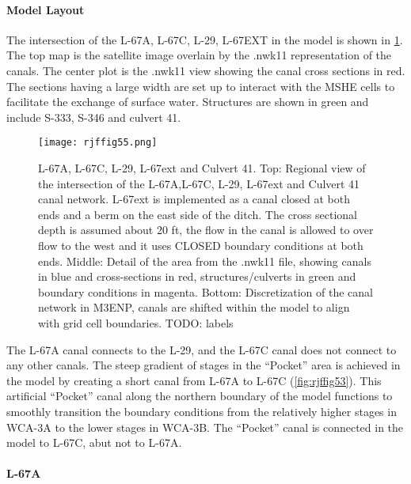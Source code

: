 \paragraph{Model Layout}

The intersection of the L-67A, L-67C, L-29, L-67EXT in the model is shown in \ref{fig:rjffig55}. The top map is the satellite image overlain by the .nwk11 representation of the canals. The center plot is the .nwk11 view showing the canal cross sections in red. The sections having a large width are set up to interact with the MSHE cells to facilitate the exchange of surface water. Structures are shown in green and include S-333, S-346 and culvert 41.

\begin{figure}[!h]
  \begin{center}
  \texttt{[image: rjffig55.png]}
  \caption[L-67A, L-67C, L-29, L-67ext and Culvert 41.]{L-67A, L-67C, L-29, L-67ext and Culvert 41. Top: Regional view of the intersection of the L-67A,L-67C, L-29, L-67ext and Culvert 41 canal network. L-67ext is implemented as a canal closed at both ends and a berm on the east side of the ditch. The cross sectional depth is assumed about 20 ft, the flow in the canal is allowed to over  flow to the west and it uses CLOSED boundary conditions at both ends.
Middle: Detail of the area from the .nwk11 file, showing canals in blue and cross-sections in red, structures/culverts in green and boundary conditions in magenta.
Bottom: Discretization of the canal network in M3ENP, canals are shifted within the model to align with grid cell boundaries.
TODO: labels}
  \label{fig:rjffig55}
  \end{center}
\end{figure}

The L-67A canal connects to the L-29, and the L-67C canal does not connect to any other canals. The steep gradient of stages in the ``Pocket'' area is achieved in the model by creating a short canal from L-67A to L-67C (\ref{fig:rjffig53}).  This artificial ``Pocket'' canal along the northern boundary of the model functions to smoothly transition the boundary conditions from the relatively higher stages in WCA-3A to the lower stages in WCA-3B.  The ``Pocket'' canal is connected in the model to L-67C, abut not to L-67A.

\paragraph{L-67A}

